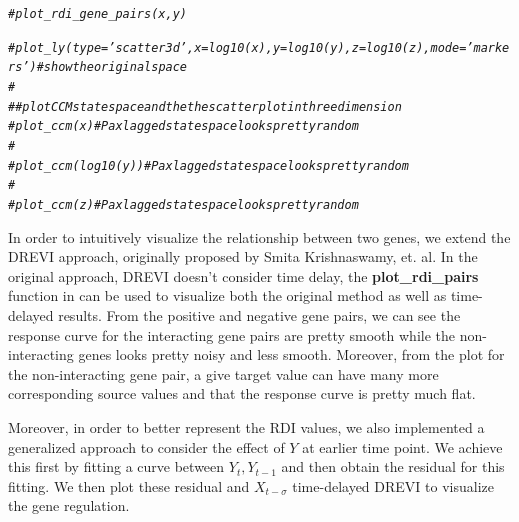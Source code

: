 \documentclass[10pt,oneside]{article}\usepackage[]{graphicx}\usepackage[]{color}
\makeatletter
\newcommand{\hlcom}[1]{\textcolor[rgb]{0.678,0.584,0.686}{\textit{#1}}}%
\newenvironment{kframe}{%
 \def\at@end@of@kframe{}%
 \ifinner\ifhmode%
  \def\at@end@of@kframe{\end{minipage}}%
  \begin{minipage}{\columnwidth}%
 \fi\fi%
 \def\FrameCommand##1{\hskip\@totalleftmargin \hskip-\fboxsep
 \colorbox{shadecolor}{##1}\hskip-\fboxsep
     \hskip-\linewidth \hskip-\@totalleftmargin \hskip\columnwidth}%
 \MakeFramed {\advance\hsize-\width
   \@totalleftmargin\z@ \linewidth\hsize
   \@setminipage}}%
 {\par\unskip\endMakeFramed%
 \at@end@of@kframe}
\newenvironment{knitrout}{}{} %
\makeatother
\begin{document}
\begin{knitrout}
\begin{kframe}
\begin{alltt}
\hlcom{# plot_rdi_gene_pairs(x, y)}

\hlcom{# plot_ly(type = 'scatter3d', x = log10(x), y = log10(y), z = log10(z), mode = 'markers') # show the original space}
\hlcom{# }
\hlcom{# # plot CCM state space and the the scatter plot in three dimension}
\hlcom{# plot_ccm(x) # Pax lagged state space looks pretty random}
\hlcom{# }
\hlcom{# plot_ccm(log10(y)) #Pax lagged state space looks pretty random}
\hlcom{# }
\hlcom{# plot_ccm(z) #Pax lagged state space looks pretty random}
\end{alltt}
\end{kframe}
\end{knitrout}

In order to intuitively visualize the relationship between two genes, we extend the DREVI approach, originally proposed by Smita Krishnaswamy, et. al. In the original approach, DREVI doesn't consider time delay, the \textbf{plot\_rdi\_pairs} function in  can be used to visualize both the original  method as well as time-delayed  results. From the positive and negative gene pairs, we can see the response curve for the interacting gene pairs are pretty smooth while the non-interacting genes looks pretty noisy and less smooth. Moreover, from the  plot for the non-interacting gene pair, a give target value can have many more corresponding source values and that the response curve is pretty much flat.

Moreover, in order to better represent the RDI values, we also implemented a generalized approach to consider the effect of $Y$ at earlier time point. We achieve this first by fitting a curve between $Y_t, Y_{t - 1}$ and then obtain the residual for this fitting. We then plot these residual and $X_{t - \sigma}$ time-delayed DREVI to visualize the gene regulation.
\end{document}
